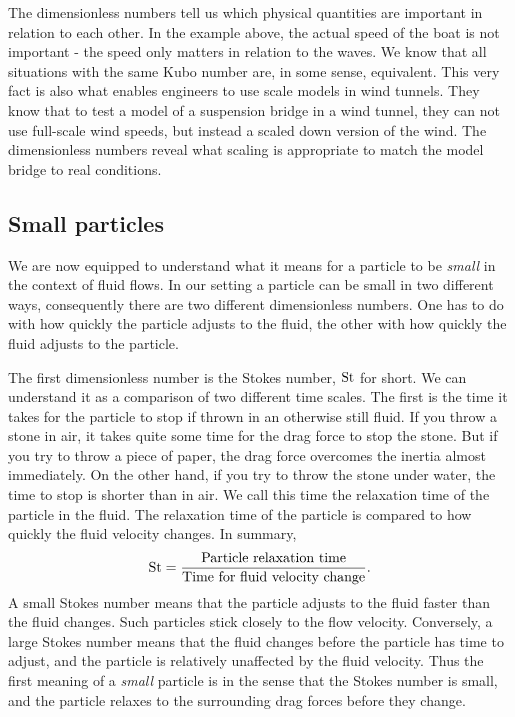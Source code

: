 \documentclass[thesis.tex]{subfiles}
\begin{document}
The dimensionless numbers tell us which physical quantities are important in relation to each other. In the example above, the actual speed of the boat is not important - the speed only matters in relation to the waves. We know that all situations with the same Kubo number are, in some sense, equivalent. This very fact is also what enables engineers to use scale models in wind tunnels. They know that to test a model of a suspension bridge in a wind tunnel, they can not use full-scale wind speeds, but instead a scaled down version of the wind. The dimensionless numbers reveal what scaling is appropriate to match the model bridge to real conditions.

\subsection*{Small particles}

We are now equipped to understand what it means for a particle to be \emph{small} in the context of fluid flows. In our setting a particle can be small in two different ways, consequently there are two different dimensionless numbers. One has to do with how quickly the particle adjusts to the fluid, the other with how quickly the fluid adjusts to the particle.

The first dimensionless number is the Stokes number, $\mbox{St}$ for short. We can understand it as a comparison of two different time scales. The first is the time it takes for the particle to stop if thrown in an otherwise still fluid. If you throw a stone in air, it takes quite some time for the drag force to stop the stone. But if you try to throw a piece of paper, the drag force overcomes the inertia almost immediately. On the other hand, if you try to throw the stone under water, the time to stop is shorter than in air. We call this time the relaxation time of the particle in the fluid. The relaxation time of the particle is compared to how quickly the fluid velocity changes. In summary, 
\begin{align*}
 	\mbox{St} = \frac{\textrm{Particle relaxation time}}{\textrm{Time for fluid velocity change}}.
 \end{align*} 
A small Stokes number means that the particle adjusts to the fluid faster than the fluid changes. Such particles stick closely to the flow velocity. Conversely, a large Stokes number means that the fluid changes before the particle has time to adjust, and the particle is relatively unaffected by the fluid velocity. Thus the first meaning of a \emph{small} particle is in the sense that the Stokes number is small, and the particle relaxes to the surrounding drag forces before they change.
\end{document}
